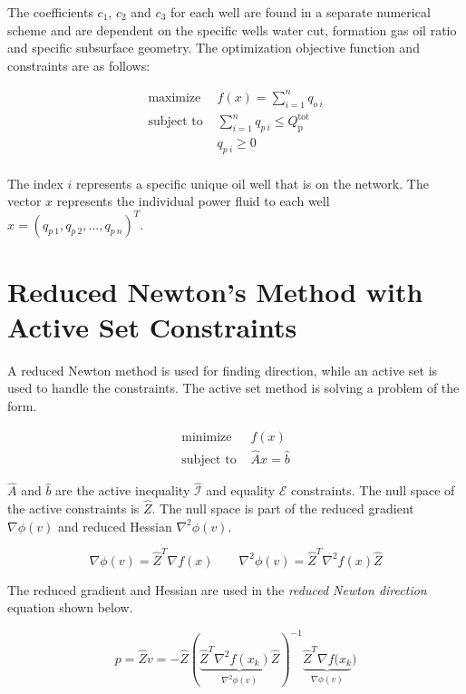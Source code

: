 \documentclass{article}
\begin{document}
The coefficients $c_{1}$, $c_{2}$ and $c_{3}$ for each well are found in a separate numerical scheme and are dependent on the specific wells water cut, formation gas oil ratio and specific subsurface geometry. The optimization objective function and constraints are as follows:

\begin{equation*}
\begin{aligned}
    \text{maximize } & f(x) = \sum_{i=1}^{n} q_{o\:i} \\
    \text{subject to } & \sum_{i=1}^{n} q_{p\:i} \leq Q_{\text{p}}^{\text{tot}} \\
    & q_{p\:i} \geq 0 \\
\end{aligned}
\end{equation*}

The index $i$ represents a specific unique oil well that is on the network. The vector $x$ represents the individual power fluid to each well $x = (q_{p\:1}, q_{p\:2}, ..., q_{p\:n})^{T}$.

\section{Reduced Newton's Method with Active Set Constraints}

A reduced Newton method is used for finding direction, while an active set is used to handle the constraints. The active set method is solving a problem of the form.

\begin{equation*}
\begin{aligned}
    \text{minimize  } & f(x) \\
    \text{subject to  } & \hat{A}x = \hat{b}
\end{aligned}
\end{equation*}

$\hat{A}$ and $\hat{b}$ are the active inequality $\hat{\mathcal{I}}$ and equality $\mathcal{E}$ constraints. The null space of the active constraints is $\hat{Z}$. The null space is part of the reduced gradient $\nabla \phi (v)$ and reduced Hessian $\nabla^{2} \phi (v)$.

$$\nabla \phi (v) = \hat{Z}^{T}\nabla f(x) \qquad \nabla^{2} \phi (v) = \hat{Z}^{T}\nabla^2 f(x) \hat{Z}$$

The reduced gradient and Hessian are used in the \textit{reduced Newton direction} equation shown below.

$$p = \hat{Z}v = -\hat{Z}(\underbrace{\hat{Z}^{T}\nabla^2 f(x_k)\hat{Z}}_{\nabla^{2}\phi(v)})^{-1}\underbrace{\hat{Z}^{T}\nabla f(x_{k}}_{\nabla \phi(v)})$$
\end{document}
